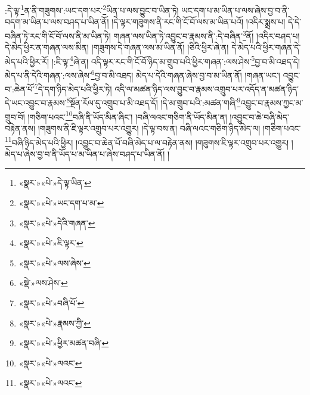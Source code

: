 :དེ་ལྟ་\footnote{«སྣར་»«པེ་»དེ་ལྟ་ཡིན་}ན་ནི་གཟུགས་:ཡང་དག་པར་\footnote{«སྣར་»«པེ་»ཡང་དག་པ་མ་}ཡིན་པ་ལས་བྱུང་བ་ཡིན་ཏེ། ཡང་དག་པ་མ་ཡིན་པ་ལས་ཞེས་བྱ་བ་ནི་བདག་མ་ཡིན་པ་ལས་བཤད་པ་ཡིན་ནོ། །དེ་ལྟར་གཟུགས་ནི་རང་གི་ངོ་བོ་ལས་མ་ཡིན་པའོ། །འདིར་སྨྲས་པ། དེ་དེ་བཞིན་ཏེ་རང་གི་ངོ་བོ་ལས་ནི་མ་ཡིན་ཏེ། གཞན་ལས་ཡིན་ཏེ་འབྱུང་བ་རྣམས་ནི་:དེ་བཞིན་\footnote{«སྣར་»«པེ་»དེའི་གཞན་}ནོ། །འདིར་བཤད་པ། དེ་མེད་ཕྱིར་ན་གཞན་ལས་མིན། །གཟུགས་དེ་གཞན་ལས་མ་ཡིན་ནོ། །ཅིའི་ཕྱིར་ཞེ་ན། དེ་མེད་པའི་ཕྱིར་གཞན་དེ་མེད་པའི་ཕྱིར་རོ། །:ཇི་ལྟ་\footnote{«སྣར་»«པེ་»ཇི་ལྟར་}ཞེ་ན། འདི་ལྟར་རང་གི་ངོ་བོ་ཉིད་མ་གྲུབ་པའི་ཕྱིར་གཞན་:ལས་ཤེས་\footnote{«སྣར་»«པེ་»ལས་ཞེས་}བྱ་བ་མི་འཐད་དེ། མེད་པ་ནི་དེའི་གཞན་:ལས་ཞེས་\footnote{«སྡེ་»ལས་ཤེས་}བྱ་བ་མི་འཐད། མེད་པ་དེའི་གཞན་ཞེས་བྱ་བ་མ་ཡིན་ནོ། །གཞན་ཡང་། འབྱུང་བ་:ཆེན་པོ་\footnote{«སྣར་»«པེ་»བཞི་པོ་}དེ་དག་ཉིད་མེད་པའི་ཕྱིར་ཏེ། འདི་ལ་མཚན་ཉིད་ལས་བྱུང་བ་རྣམས་འགྲུབ་པར་འདོད་ན་མཚན་ཉིད་དེ་ཡང་འབྱུང་བ་རྣམས་\footnote{«སྣར་»«པེ་»རྣམས་ཀྱི་}སྔོན་རོལ་དུ་འགྲུབ་པ་མི་འཐད་དོ། །དེ་མ་གྲུབ་པའི་:མཚན་གཞི་\footnote{«སྣར་»«པེ་»ཕྱིར་མཚན་བཞི་}འབྱུང་བ་རྣམས་ཀྱང་མ་གྲུབ་བོ། །གཅིག་པའང་\footnote{«སྣར་»«པེ་»ལའང་}བཞི་ནི་ཡོད་མིན་ཞིང་། །བཞི་ལའང་གཅིག་ནི་ཡོད་མིན་ན། །འབྱུང་བ་ཆེ་བཞི་མེད་བརྟེན་ནས། །གཟུགས་ནི་ཇི་ལྟར་འགྲུབ་པར་འགྱུར། །དེ་ལྟ་བས་ན། བཞི་ལའང་གཅིག་ཉིད་མེད་ལ། །གཅིག་པའང་\footnote{«སྣར་»«པེ་»ལའང་}བཞི་ཉིད་མེད་པའི་ཕྱིར། །འབྱུང་བ་ཆེན་པོ་བཞི་མེད་པ་ལ་བརྟེན་ནས། །གཟུགས་ཇི་ལྟར་འགྲུབ་པར་འགྱུར། །མེད་པ་ཞེས་བྱ་བ་ནི་ཡོད་པ་མ་ཡིན་པ་ཞེས་བཤད་པ་ཡིན་ནོ། །
